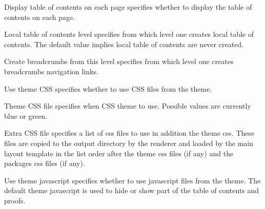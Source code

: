 \begin{configuration}{Display table of contents on each page}
specifies whether to display the table of contents on each page.
\end{configuration}


\begin{configuration}{Local table of contents level}
specifies from which level one creates local table of contents. The
default value implies local table of contents are never created.
\end{configuration}


\begin{configuration}{Create breadcrumbs from this level}
specifies from which level one creates breadcrumbs navigation links.
\end{configuration}

\begin{configuration}{Use theme CSS}
specifies whether to use CSS files from the theme.
\end{configuration}

\begin{configuration}{Theme CSS file}
specifies when CSS theme to use. Possible values are currently blue or
green.
\end{configuration}

\begin{configuration}{Extra CSS file}
specifies a list of css files to use in addition the
theme css. These files are copied to the output directory by the
renderer and loaded by the main layout template in the list order after
the theme css files (if any) and the packages css files (if any).
\end{configuration}

\begin{configuration}{Use theme javascript}
specifies whether to use javascript files from the theme. The default
theme javascript is used to hide or show part of the table of contents
and proofs.
\end{configuration}

